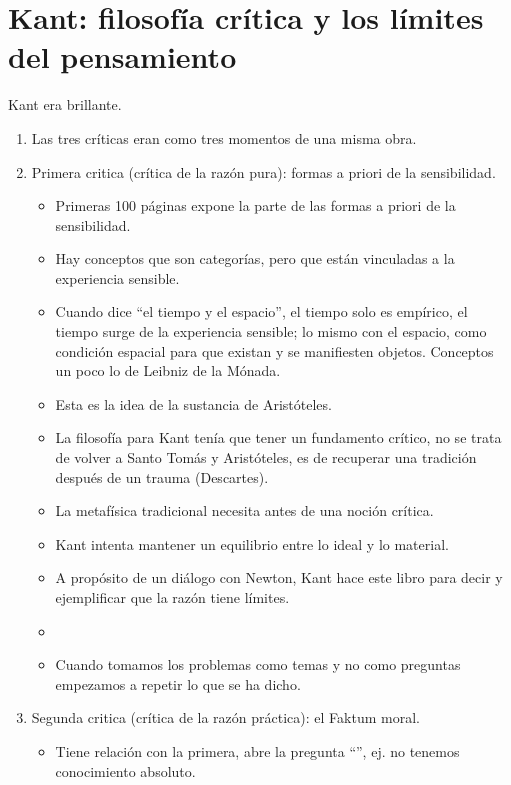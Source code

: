 \section{Kant: filosofía crítica y los límites del pensamiento}
Kant era brillante. 
\begin{enumerate}
    \item Las tres críticas eran como tres momentos de una misma obra. 
    \item Primera critica (crítica de la razón pura): formas a priori de la sensibilidad. 
        \begin{itemize}
            \item Primeras 100 páginas expone la parte de las formas a priori de la sensibilidad.
            \item Hay conceptos que son categorías, pero que están vinculadas a la experiencia sensible. 
            \item Cuando dice ``el tiempo y el espacio'', el tiempo solo es empírico, el tiempo surge de la experiencia sensible; lo mismo con el espacio, como condición espacial para que existan y se manifiesten objetos. Conceptos un poco lo de Leibniz de la Mónada.
            \item Esta es la idea de la sustancia de Aristóteles. 
            \item La filosofía para Kant tenía que tener un fundamento crítico, no se trata de volver a Santo Tomás y Aristóteles, es de recuperar una tradición después de un trauma (Descartes). 
            \item La metafísica tradicional necesita antes de una noción crítica. 
            \item Kant intenta mantener un equilibrio entre lo ideal y lo material.
            \item A propósito de un diálogo con Newton, Kant hace este libro para decir y ejemplificar que la razón tiene límites. 
            \item {} 
            \item Cuando tomamos los problemas como temas y no como preguntas empezamos a repetir lo que se ha dicho. 
        \end{itemize}
    \item Segunda critica (crítica de la razón práctica): el Faktum moral.
        \begin{itemize}
            \item Tiene relación con la primera, abre la pregunta ``'', ej. no tenemos conocimiento absoluto. 

\end{itemize}
\end{enumerate}

